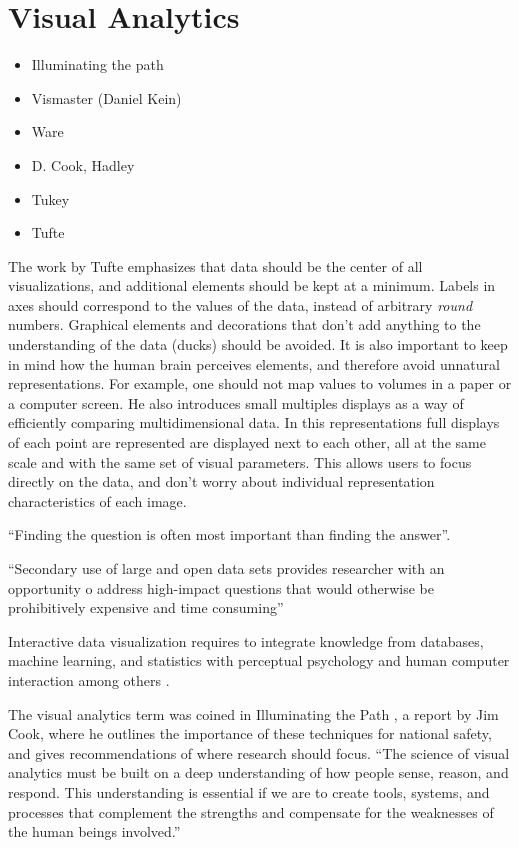 
\section{Visual Analytics}
\begin{itemize}
	\item Illuminating the path
	\item Vismaster (Daniel Kein)	
	\item Ware
	\item D. Cook, Hadley
	\item Tukey
	\item Tufte	
\end{itemize}	

The work by Tufte \autocite{tufte_visual_1983} emphasizes that data should be the center of all visualizations, and additional elements should be kept at a minimum. Labels in axes should correspond to the values of the data, instead of arbitrary \emph{round} numbers. Graphical elements and decorations that don't add anything to the understanding of the data (ducks) should be avoided. It is also important to keep in mind how the human brain perceives elements, and therefore avoid unnatural representations. For example, one should not map values to volumes in a paper or a computer screen. He also introduces small multiples displays as a way of efficiently comparing multidimensional data. In this representations full displays of each point are represented are displayed next to each other, all at the same scale and with the same set of visual parameters. This allows users to focus directly on the data, and don't worry about individual representation characteristics of each image.

``Finding the question is often most important than finding the answer''\autocite{tukey_we_1980}.



``Secondary use of large and open data sets provides researcher with an opportunity o address high-impact questions that would otherwise be prohibitively expensive and time consuming'' \autocite{viangteeravat_giving_2014}


\autocite{wickham_practical_2008}

Interactive data visualization requires to integrate knowledge from databases, machine learning, and statistics with perceptual psychology and human computer interaction among others \autocite{ward_interactive_2010}.


The visual analytics term was coined in Illuminating the Path \autocite{cook_illuminating_2005}, a report by Jim Cook, where he outlines the importance of these techniques for national safety, and gives recommendations of 	where research should focus. ``The science of visual analytics must be built on a deep understanding of how
people sense, reason, and respond. This understanding is essential if we are to create
tools, systems, and processes that complement the strengths and compensate for the
weaknesses of the human beings involved.''

